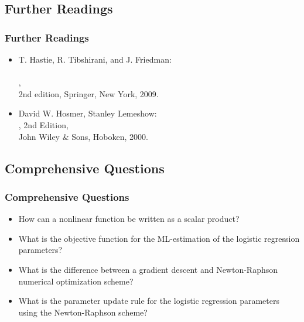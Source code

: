 

\subsection{Further Readings}

\begin{frame}
  \frametitle{Further Readings}

  \begin{itemize}
    \item T. Hastie, R. Tibshirani, and J. Friedman: \\
      \\
      ,\\
      2nd edition, Springer, New York, 2009. \\[.3cm]
    \item David W. Hosmer, Stanley Lemeshow: \\
      , 2nd Edition, \\
      John Wiley \& Sons, Hoboken, 2000.
  \end{itemize}
\end{frame}


\subsection{Comprehensive Questions}

\begin{frame}
  \frametitle{Comprehensive Questions \cont}

  \begin{itemize}
    \item How can a nonlinear function be written as a scalar product? \\[.7cm] \pause
    \item What is the objective function for the ML-estimation of the logistic regression parameters? \\[.7cm] \pause
    \item What is the difference between a gradient descent and Newton-Raphson numerical optimization scheme? \\[.7cm] \pause
    \item What is the parameter update rule for the logistic regression parameters using the Newton-Raphson scheme?
  \end{itemize}
\end{frame}

